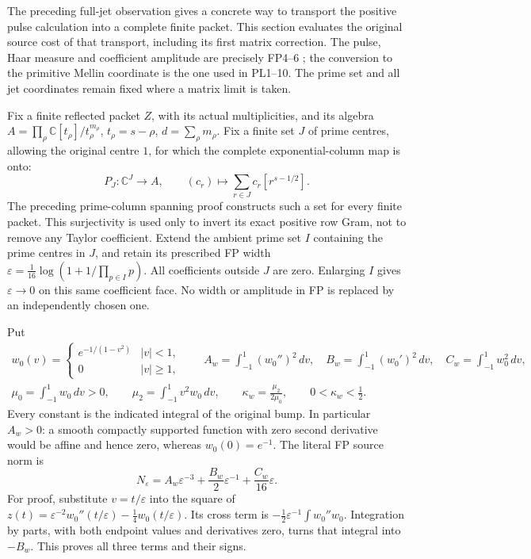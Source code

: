 \documentclass[11pt,a4paper]{article}
\theoremstyle{definition}\newtheorem{definition}[theorem]{Definition}
\newcommand{\C}{\mathbb C}\newcommand{\R}{\mathbb R}
\begin{document}
The preceding full-jet observation gives a concrete way to
transport the positive pulse calculation into a complete finite
packet. This section evaluates the original source cost of that
transport, including its first matrix correction. The pulse,
Haar measure and coefficient amplitude are precisely FP4--6
\cite{FinitePrimePulse}; the conversion to the primitive Mellin
coordinate is the one used in PL1--10. The prime set and all
jet coordinates remain fixed where a matrix limit is taken.

Fix a finite reflected packet $Z$, with its actual multiplicities,
and its algebra $A=\prod_\rho\C[t_\rho]/t_\rho^{m_\rho}$,
$t_\rho=s-\rho$, $d=\sum_\rho m_\rho$. Fix a finite set $J$
of prime centres, allowing the original centre $1$, for which
the complete exponential-column map is onto:
\[
 P_J:\C^J\longrightarrow A,\qquad
 (c_r)\longmapsto\sum_{r\in J}c_r[r^{s-1/2}].
 \tag{PCO1}\label{pco:prime-columns}
\]
The preceding prime-column spanning proof constructs such a set
for every finite packet. This surjectivity is used only to
invert its exact positive row Gram, not to remove any Taylor
coefficient. Extend the ambient prime set $I$ containing the
prime centres in $J$, and retain its prescribed FP width
$\varepsilon=\frac1{16}\log(1+1/\prod_{p\in I}p)$.
All coefficients outside $J$ are zero. Enlarging $I$ gives
$\varepsilon\to0$ on this same coefficient face. No width or
amplitude in FP is replaced by an independently chosen one.

Put
\[
\begin{gathered}
 w_0(v)=\begin{cases}e^{-1/(1-v^2)}&|v|<1,\\0&|v|\ge1,
             \end{cases}\qquad
 A_w=\int_{-1}^1(w_0'')^2\,dv,\quad
 B_w=\int_{-1}^1(w_0')^2\,dv,\quad
 C_w=\int_{-1}^1w_0^2\,dv,\\
 \mu_0=\int_{-1}^1w_0\,dv>0,\qquad
 \mu_2=\int_{-1}^1v^2w_0\,dv,\qquad
 \kappa_w=\frac{\mu_2}{2\mu_0},\qquad 0<\kappa_w<\frac12.
\end{gathered}
 \tag{PCO2}\label{pco:constants}
\]
Every constant is the indicated integral of the original bump.
In particular $A_w>0$: a smooth compactly supported function
with zero second derivative would be affine and hence zero,
whereas $w_0(0)=e^{-1}$. The literal FP source norm is
\[
 N_\varepsilon
 =A_w\varepsilon^{-3}+\frac{B_w}{2}\varepsilon^{-1}
                         +\frac{C_w}{16}\varepsilon.
 \tag{PCO3}\label{pco:mass}
\]
For proof, substitute $v=t/\varepsilon$ into the square of
$z(t)=\varepsilon^{-2}w_0''(t/\varepsilon)
                  -\frac14w_0(t/\varepsilon)$.
Its cross term is $-\frac12\varepsilon^{-1}\int w_0''w_0$.
Integration by parts, with both endpoint values and derivatives
zero, turns that integral into $-B_w$. This proves all three
terms and their signs.
\end{document}
